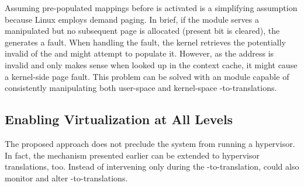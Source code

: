             Assuming pre-populated \va mappings before \sname is activated is a simplifying assumption because Linux employs demand paging.
            In brief, if the \sname module serves a manipulated \pte but no subsequent page is allocated (present bit is cleared), the \mmu generates a fault. When handling the fault, the kernel retrieves the potentially invalid \pa of the \pte and might attempt to populate it.
            However, as the address is invalid and only makes sense when looked up in the context cache, it might cause a kernel-side page fault. This problem can be solved with an \sname module capable of consistently manipulating both user-space and kernel-space \va-to-\pa translations.

    \subsection{Enabling Virtualization at All Levels}

        The proposed approach does not preclude the system from running a hypervisor.
        In fact, the mechanism presented earlier can be extended to hypervisor translations, too.
        Instead of intervening only during the \va-to-\pa translation, \sname could also monitor and alter \ipa-to-\pa translations.
       